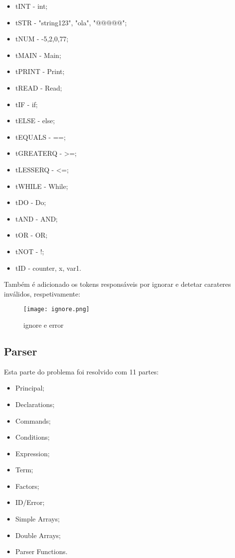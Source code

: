 \documentclass[11pt,a4paper]{report}%
\begin{document}
\newpage
\begin{itemize}
     \item t\textunderscore INT - int;
     \item t\textunderscore STR - "string123", "ola", "@@@@@";
     \item t\textunderscore NUM - -5,2,0,77;
     \item t\textunderscore MAIN - Main;
     \item t\textunderscore PRINT - Print;
     \item t\textunderscore READ - Read;
     \item t\textunderscore IF - if;
     \item t\textunderscore ELSE - else;
     \item t\textunderscore EQUALS - ==;
     \item t\textunderscore GREATERQ - >=;
     \item t\textunderscore LESSERQ - <=;
     \item t\textunderscore WHILE - While;
     \item t\textunderscore DO - Do;
     \item t\textunderscore AND - AND;
     \item t\textunderscore OR - OR;
     \item t\textunderscore NOT - !;
     \item t\textunderscore ID - counter, x, var1.
  \end{itemize}

\newpage
Também é adicionado os tokens responsáveis por ignorar e detetar carateres inválidos, respetivamente:


\begin{figure}[htbp]
\centerline{\texttt{[image: ignore.png]}}
\caption{ignore e error}
\label{fig}
\end{figure} 

\newpage
\subsection{Parser} \label{subsec:parser}
Esta parte do problema foi resolvido com 11 partes:

\begin{itemize}
     \item Principal;
     \item Declarations;
     \item Commands;
     \item Conditions;
     \item Expression;
     \item Term;
     \item Factors;
     \item ID/Error;
     \item Simple Arrays;
     \item Double Arrays;
     \item Parser Functions.
  \end{itemize}
\end{document}
